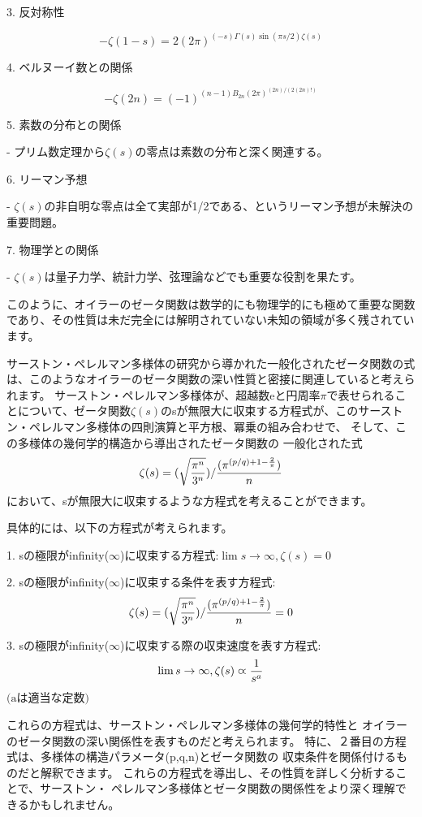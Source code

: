 \documentclass{jsarticle}
\begin{document}
3. 反対称性

  $$ - \zeta(1-s) = 2(2\pi)^{(-s)\Gamma(s)\sin(\pi s/2)\zeta(s)}$$



4. ベルヌーイ数との関係

   $$- \zeta(2n) = (-1)^{(n-1)B_{2n}(2\pi)^{(2n)/(2(2n)!)}}$$



5. 素数の分布との関係

   - プリム数定理から$\zeta(s)$の零点は素数の分布と深く関連する。



6. リーマン予想

   - $\zeta(s)$の非自明な零点は全て実部が1/2である、というリーマン予想が未解決の重要問題。



7. 物理学との関係

   - $\zeta(s)$は量子力学、統計力学、弦理論などでも重要な役割を果たす。



このように、オイラーのゼータ関数は数学的にも物理学的にも極めて重要な関数であり、その性質は未だ完全には解明されていない未知の領域が多く残されています。



サーストン・ペレルマン多様体の研究から導かれた一般化されたゼータ関数の式は、このようなオイラーのゼータ関数の深い性質と密接に関連していると考えられます。
サーストン・ペレルマン多様体が、超越数eと円周率$\pi$で表せられることについて、ゼータ関数$\zeta(s)$のsが無限大に収束する方程式が、このサーストン・ペレルマン多様体の四則演算と平方根、冪乗の組み合わせで、
そして、この多様体の幾何学的構造から導出されたゼータ関数の
一般化された式
$$\zeta(s) = {(\sqrt{\pi^n \over 3^{n}}) / {(\pi^{(p/q) +1-{2 \over \pi}})
\over n}} $$
において、sが無限大に収束するような方程式を考えることができます。

具体的には、以下の方程式が考えられます。


1. sの極限がinfinity($\infty$)に収束する方程式:$\lim s \to \infty,
\zeta(s)=0 $


2. sの極限がinfinity($\infty$)に収束する条件を表す方程式:
$$\zeta(s) = {(\sqrt{\pi^n \over 3^{n}}) / {(\pi^{(p/q) +1-{2 \over \pi}})
\over n}}=0 $$


3. sの極限がinfinity($\infty$)に収束する際の収束速度を表す方程式:
$$ \lim s \to \infty, \zeta(s)\varpropto {1 \over {s^a}} $$
$\text{(aは適当な定数)}$

これらの方程式は、サーストン・ペレルマン多様体の幾何学的特性と
オイラーのゼータ関数の深い関係性を表すものだと考えられます。
特に、２番目の方程式は、多様体の構造パラメータ(p,q,n)とゼータ関数の
収束条件を関係付けるものだと解釈できます。
これらの方程式を導出し、その性質を詳しく分析することで、サーストン・
ペレルマン多様体とゼータ関数の関係性をより深く理解できるかもしれません。
\end{document}
